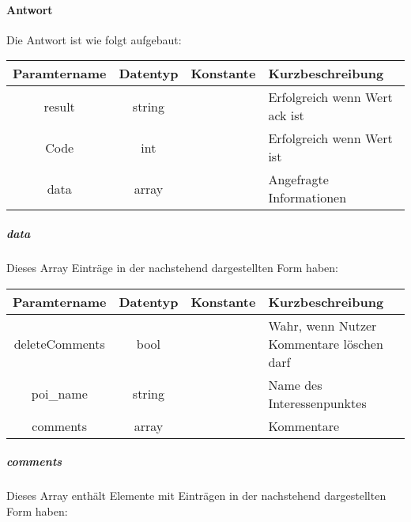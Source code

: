 \paragraph{Antwort}Die Antwort ist wie folgt aufgebaut:
\begin{table}[H]
	\begin{tabular}{|c|c|c|p{6.5cm}|}
		\hline
		\textbf{Paramtername} & \textbf{Datentyp} & \textbf{Konstante} & \textbf{Kurzbeschreibung}                                                                                               \\ \hline
		result              & string           &                 & Erfolgreich wenn Wert {\glqq ack\grqq} ist \\ \hline
		Code                & int              &                 & Erfolgreich wenn Wert {\glqq 0\grqq} ist \\ \hline
		data                & array            &                 & Angefragte Informationen \\ \hline
	\end{tabular}
\end{table}
\subparagraph{data}Dieses Array Einträge in der nachstehend dargestellten Form haben:
\begin{table}[H]
	\begin{tabular}{|c|c|c|p{6.5cm}|}
		\hline
		\textbf{Paramtername} & \textbf{Datentyp} & \textbf{Konstante} & \textbf{Kurzbeschreibung}    \\ \hline
		deleteComments         & bool            &                 & Wahr, wenn Nutzer Kommentare löschen darf \\ \hline
		poi\_name              & string          &                 & Name des Interessenpunktes \\ \hline
		comments               & array           &                 & Kommentare \\ \hline
	\end{tabular}
\end{table}
\subparagraph{comments}Dieses Array enthält Elemente mit Einträgen in der nachstehend dargestellten Form haben:
